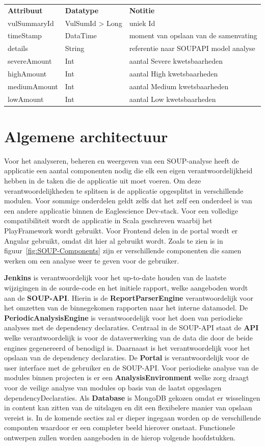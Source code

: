 \begin{tabular}{lll}
    \textbf{Attribuut} & \textbf{Datatype} & \textbf{Notitie}\\
    vulSummaryId & VulSumId > Long & uniek Id\\
    timeStamp & DataTime & moment van opslaan van de samenvating\\
    details & String & referentie naar SOUPAPI model analyse\\
    severeAmount & Int & aantal Severe kwetsbaarheden\\
    highAmount & Int & aantal High kwetsbaarheden\\
    mediumAmount & Int & aantal Medium kwetsbaarheden\\
    lowAmount & Int & aantal Low kwetsbaarheden\\
\end{tabular}

\section{Algemene architectuur}\label{sec:algemene-architectuur}
Voor het analyseren, beheren en weergeven van een SOUP-analyse heeft de applicatie een aantal componenten nodig die elk een eigen verantwoordelijkheid hebben in de taken die de applicatie uit moet voeren. Om deze verantwoordelijkheden te splitsen is de applicatie opgesplitst in verschillende modulen. Voor sommige onderdelen geldt zelfs dat het zelf een onderdeel is van een andere applicatie binnen de Eaglescience Dev-stack. Voor een volledige compatibiliteit wordt de applicatie in Scala geschreven waarbij het PlayFramework wordt gebruikt. Voor Frontend delen in de portal wordt er Angular gebruikt, omdat dit hier al gebruikt wordt. Zoals te zien is in figuur~\ref{fig:SOUP-Components} zijn er verschillende componenten die samen werken om een analyse weer te geven voor de gebruiker.

\textbf{Jenkins} is verantwoordelijk voor het up-to-date houden van de laatste wijzigingen in de sourde-code en het initiele rapport, welke aangeboden wordt aan de \textbf{SOUP-API}. Hierin is de  \textbf{ReportParserEngine} verantwoordelijk voor het omzetten van de binnegekomen rapporten naar het interne datamodel. De \textbf{PeriodicAnalysisEngine} is verantwoordelijk voor het doen van periodieke analyses met de dependency declaraties. Centraal in de SOUP-API staat de \textbf{API} welke verantwoordelijk is voor de dataverwerking van de data die door de beide engines gegenereerd of benodigd is. Daarnaast is het verantwoordelijk voor het opslaan van de dependency declaraties. De \textbf{Portal} is verantwoordelijk voor de user interface met de gebruiker en de SOUP-API. Voor periodieke analyse van de modules binnen projecten is er een \textbf{AnalysisEnvironment} welke zorg draagt voor de veilige analyse van modules op basis van de laatst opgeslagen dependencyDeclaraties. Als \textbf{Database} is MongoDB gekozen omdat er wisselingen in content kan zitten van de uitslagen en dit een flexibelere manier van opslaan vereist is.
In de komende secties zal er dieper ingegaan worden op de verschillende componten waardoor er een completer beeld hierover onstaat. Functionele ontwerpen zullen worden aangeboden in de hierop volgende hoofdstukken.

